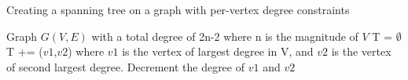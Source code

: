 \documentclass{article}
\begin{document}
\begin{algorithm}
\caption{Creating a spanning tree on a graph with per-vertex degree constraints}

    \begin{algorithmic}[1]
    \State Graph $G(V,E)$ with a total degree of 2n-2 where n is the magnitude of $V$
    \State T = $\emptyset$
    \State T += ($v1$,$v2$) where $v1$ is the vertex of largest degree in V, and $v2$ is the vertex of second largest degree. Decrement the degree of $v1$ and $v2$
    \EndWhile
\end{algorithmic}
\end{algorithm}
\end{document}
